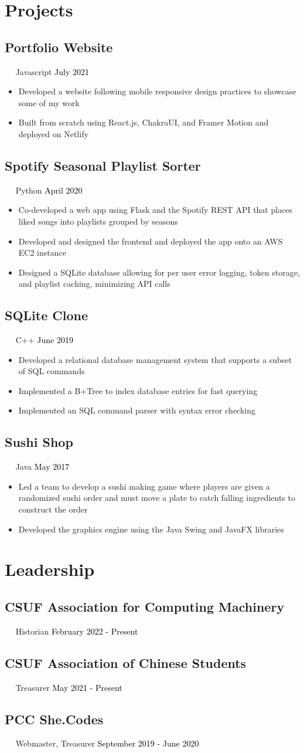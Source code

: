 \documentclass{article}
\newcommand{\resumesection}[3]{
    \subsection*{#1}
    \ 
    \ 
    \small
    \textcolor{csufgrey}{#2}
    \normalsize
    \hfill
    \textcolor{black}{#3}
    \normalsize
}
\begin{document}
\section*{Projects}
\resumesection{Portfolio Website}{Javascript}{July 2021}
\begin{itemize}
    \item Developed a website following mobile responsive design practices to showcase some of my work
    \item Built from scratch using React.js, ChakraUI, and Framer Motion and deployed on Netlify
\end{itemize}
\resumesection{Spotify Seasonal Playlist Sorter}{Python}{April 2020}
\begin{itemize}
    \item Co-developed a web app using Flask and the Spotify REST API that places liked songs into playlists grouped by seasons
    \item Developed and designed the frontend and deployed the app onto an AWS EC2 instance
    \item Designed a SQLite database allowing for per user error logging, token storage, and playlist caching, minimizing API calls
\end{itemize}

\resumesection{SQLite Clone}{C++}{June 2019}
\begin{itemize}
    \item Developed a relational database management system that supports a subset of SQL commands
    \item Implemented a B+Tree to index database entries for fast querying
    \item Implemented an SQL command parser with syntax error checking
\end{itemize}

\resumesection{Sushi Shop}{Java}{May 2017}
\begin{itemize}
    \item Led a team to develop a sushi making game where players are given a randomized sushi order and must move a plate to catch falling ingredients to construct the order
    \item Developed the graphics engine using the Java Swing and JavaFX libraries
\end{itemize}
\section*{Leadership}
\resumesection{CSUF Association for Computing Machinery}{Historian}{February 2022 - Present}
\resumesection{CSUF Association of Chinese Students}{Treasurer}{May 2021 - Present}
\resumesection{PCC She.Codes}{Webmaster, Treasurer}{September 2019 - June 2020}
\end{document}

